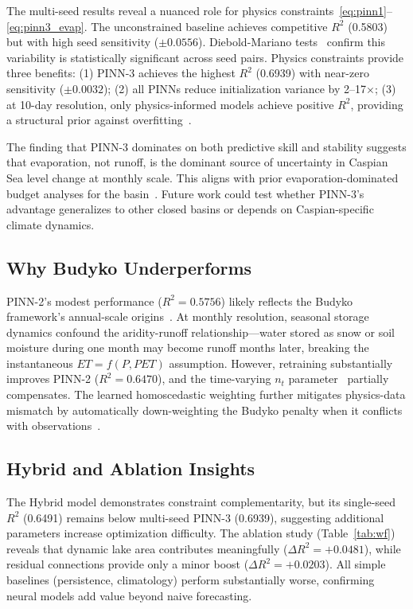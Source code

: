 \documentclass[conference,a4paper]{IEEEtran}
\begin{document}
The multi-seed results reveal a nuanced role for physics constraints~\eqref{eq:pinn1}--\eqref{eq:pinn3_evap}. The unconstrained baseline achieves competitive $R^2$ (0.5803) but with high seed sensitivity ($\pm0.0556$). Diebold-Mariano tests~\cite{diebold1995comparing} confirm this variability is statistically significant across seed pairs. Physics constraints provide three benefits: (1) PINN-3 achieves the highest $R^2$ (0.6939) with near-zero sensitivity ($\pm0.0032$); (2) all PINNs reduce initialization variance by 2--17$\times$; (3) at 10-day resolution, only physics-informed models achieve positive $R^2$, providing a structural prior against overfitting~\cite{huang2025physics,cuomo2022pinn}.

The finding that PINN-3 dominates on both predictive skill and stability suggests that evaporation, not runoff, is the dominant source of uncertainty in Caspian Sea level change at monthly scale. This aligns with prior evaporation-dominated budget analyses for the basin~\cite{samant2023climate}. Future work could test whether PINN-3's advantage generalizes to other closed basins or depends on Caspian-specific climate dynamics.

\subsection{Why Budyko Underperforms}

PINN-2's modest performance ($R^2{=}0.5756$) likely reflects the Budyko framework's annual-scale origins~\cite{cheng2025global}. At monthly resolution, seasonal storage dynamics confound the aridity-runoff relationship---water stored as snow or soil moisture during one month may become runoff months later, breaking the instantaneous $ET{=}f(P,PET)$ assumption. However, retraining substantially improves PINN-2 ($R^2{=}0.6470$), and the time-varying $n_t$ parameter~\cite{liu2025timevarying} partially compensates. The learned homoscedastic weighting further mitigates physics-data mismatch by automatically down-weighting the Budyko penalty when it conflicts with observations~\cite{kendall2017uncertainty}.

\subsection{Hybrid and Ablation Insights}

The Hybrid model demonstrates constraint complementarity, but its single-seed $R^2$ (0.6491) remains below multi-seed PINN-3 (0.6939), suggesting additional parameters increase optimization difficulty. The ablation study (Table~\ref{tab:wf}) reveals that dynamic lake area contributes meaningfully ($\Delta R^2{=}{+}0.0481$), while residual connections provide only a minor boost ($\Delta R^2{=}{+}0.0203$). All simple baselines (persistence, climatology) perform substantially worse, confirming neural models add value beyond naive forecasting.
\end{document}
